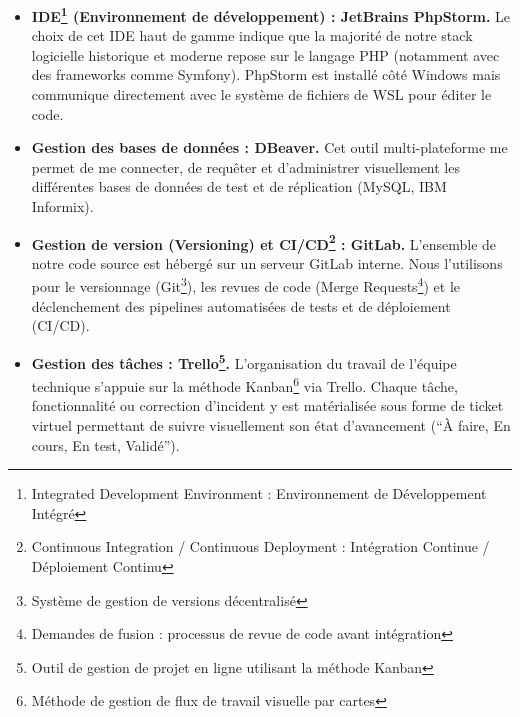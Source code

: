 \begin{itemize}[label=\textbullet]
    \item \textbf{IDE\footnote{Integrated Development Environment : Environnement de Développement Intégré} (Environnement de développement) : JetBrains PhpStorm.} Le choix de cet IDE haut de gamme indique que la majorité de notre stack logicielle historique et moderne repose sur le langage PHP (notamment avec des frameworks comme Symfony). PhpStorm est installé côté Windows mais communique directement avec le système de fichiers de WSL pour éditer le code.
    \item \textbf{Gestion des bases de données : DBeaver.} Cet outil multi-plateforme me permet de me connecter, de requêter et d'administrer visuellement les différentes bases de données de test et de réplication (MySQL, IBM Informix).
    \item \textbf{Gestion de version (Versioning) et CI/CD\footnote{Continuous Integration / Continuous Deployment : Intégration Continue / Déploiement Continu} : GitLab.} L'ensemble de notre code source est hébergé sur un serveur GitLab interne. Nous l'utilisons pour le versionnage (Git\footnote{Système de gestion de versions décentralisé}), les revues de code (Merge Requests\footnote{Demandes de fusion : processus de revue de code avant intégration}) et le déclenchement des pipelines automatisées de tests et de déploiement (CI/CD).
    \item \textbf{Gestion des tâches : Trello\footnote{Outil de gestion de projet en ligne utilisant la méthode Kanban}.} L'organisation du travail de l'équipe technique s'appuie sur la méthode Kanban\footnote{Méthode de gestion de flux de travail visuelle par cartes} via Trello. Chaque tâche, fonctionnalité ou correction d'incident y est matérialisée sous forme de ticket virtuel permettant de suivre visuellement son état d'avancement (\enquote{À faire, En cours, En test, Validé}).
\end{itemize}

\newpage